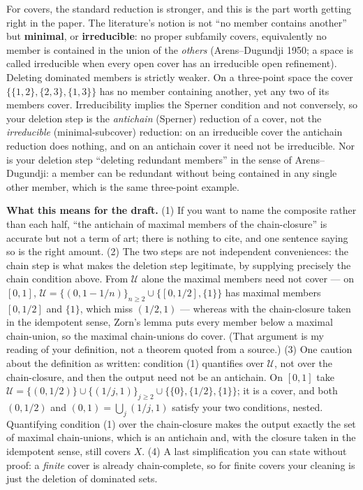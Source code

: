 \documentclass[
]{article}
\begin{document}
For covers, the standard reduction is stronger, and this is the part
worth getting right in the paper. The literature's notion is not ``no
member contains another'' but \textbf{minimal}, or \textbf{irreducible}:
no proper subfamily covers, equivalently no member is contained in the
union of the \emph{others} (Arens--Dugundji 1950; a space is called
irreducible when every open cover has an irreducible open refinement).
Deleting dominated members is strictly weaker. On a three-point space
the cover \(\{\{1,2\},\{2,3\},\{1,3\}\}\) has no member containing
another, yet any two of its members cover. Irreducibility implies the
Sperner condition and not conversely, so your deletion step is the
\emph{antichain} (Sperner) reduction of a cover, not the
\emph{irreducible} (minimal-subcover) reduction: on an irreducible cover
the antichain reduction does nothing, and on an antichain cover it need
not be irreducible. Nor is your deletion step ``deleting redundant
members'' in the sense of Arens--Dugundji: a member can be redundant
without being contained in any single other member, which is the same
three-point example.

\textbf{What this means for the draft.} (1) If you want to name the
composite rather than each half, ``the antichain of maximal members of
the chain-closure'' is accurate but not a term of art; there is nothing
to cite, and one sentence saying so is the right amount. (2) The two
steps are not independent conveniences: the chain step is what makes the
deletion step legitimate, by supplying precisely the chain condition
above. From \(\mathcal U\) alone the maximal members need not cover ---
on \([0,1]\), \(\mathcal U=\{(0,1-1/n)\}_{n\ge2}\cup\{[0,1/2],\{1\}\}\)
has maximal members \([0,1/2]\) and \(\{1\}\), which miss \((1/2,1)\)
--- whereas with the chain-closure taken in the idempotent sense, Zorn's
lemma puts every member below a maximal chain-union, so the maximal
chain-unions do cover. (That argument is my reading of your definition,
not a theorem quoted from a source.) (3) One caution about the
definition as written: condition (1) quantifies over \(\mathcal U\), not
over the chain-closure, and then the output need not be an antichain. On
\([0,1]\) take
\(\mathcal U=\{(0,1/2)\}\cup\{(1/j,1)\}_{j\ge2}\cup\{\{0\},\{1/2\},\{1\}\}\);
it is a cover, and both \((0,1/2)\) and \((0,1)=\bigcup_j(1/j,1)\)
satisfy your two conditions, nested. Quantifying condition (1) over the
chain-closure makes the output exactly the set of maximal chain-unions,
which is an antichain and, with the closure taken in the idempotent
sense, still covers \(X\). (4) A last simplification you can state
without proof: a \emph{finite} cover is already chain-complete, so for
finite covers your cleaning is just the deletion of dominated sets.
\end{document}

